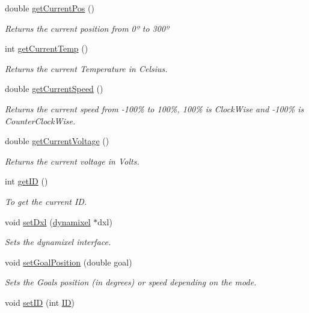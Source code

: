 \begin{DoxyCompactItemize}
double \hyperlink{a00001_af9722b9c1f82fbfd97fe5e0a44369e8a}{get\+Current\+Pos} ()
\begin{DoxyCompactList}\small\item\em Returns the current position from 0º to 300º \end{DoxyCompactList}\item 
int \hyperlink{a00001_ab16fad4c8c034d56acce15fc9102f34d}{get\+Current\+Temp} ()
\begin{DoxyCompactList}\small\item\em Returns the current Temperature in Celsius. \end{DoxyCompactList}\item 
double \hyperlink{a00001_a23c7ed54716c4b144a68d801f324e3ef}{get\+Current\+Speed} ()
\begin{DoxyCompactList}\small\item\em Returns the current speed from -\/100\% to 100\%, 100\% is Clock\+Wise and -\/100\% is Counter\+Clock\+Wise. \end{DoxyCompactList}\item 
double \hyperlink{a00001_a9ef946bfc1ad4dce5fed4101ed321efe}{get\+Current\+Voltage} ()
\begin{DoxyCompactList}\small\item\em Returns the current voltage in Volts. \end{DoxyCompactList}\item 
int \hyperlink{a00001_a745ab1f31fa2cd8c7a5797aeb605cd0b}{get\+I\+D} ()
\begin{DoxyCompactList}\small\item\em To get the current I\+D. \end{DoxyCompactList}\item 
void \hyperlink{a00001_a74a5a89387f0f51e053f05a6c2c0b9c5}{set\+Dxl} (\hyperlink{a00004}{dynamixel} $\ast$dxl)
\begin{DoxyCompactList}\small\item\em Sets the dynamixel interface. \end{DoxyCompactList}\item 
void \hyperlink{a00001_a6b27a3c6314604b499d9fa47d180f5d3}{set\+Goal\+Position} (double goal)
\begin{DoxyCompactList}\small\item\em Sets the Goal\textquotesingle{}s position (in degrees) or speed depending on the mode. \end{DoxyCompactList}\item 
void \hyperlink{a00001_ab9fe5d0e2286985977985de6d84b1103}{set\+I\+D} (int \hyperlink{a00001_a08d272b502d65464202a3aa97825aec0ab2565d5698c9d943a8bcecf02b1389ad}{I\+D})

\end{DoxyCompactItemize}
